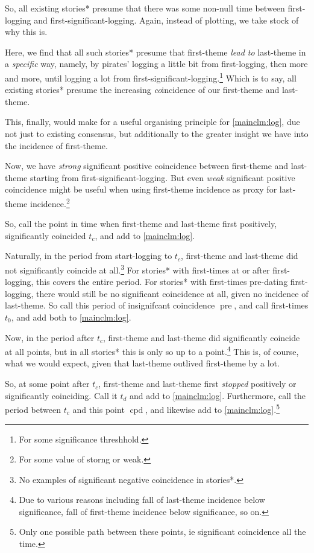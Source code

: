 \documentclass{amsart}
\DeclareMathOperator{\pre}{pre}%
\DeclareMathOperator{\cpd}{cpd}%
\theoremstyle{definition}
\theoremstyle{remark}
\begin{document}
			So, all existing stories* presume that there was some non-null time between first-logging and first-significant-logging. Again, instead of plotting, we take stock of why this is.
			
			Here, we find that all such stories* presume that first-theme \emph{lead to} last-theme in a \emph{specific} way, namely, by pirates' logging a little bit from first-logging, then more and more, until logging a lot from first-significant-logging.\footnote{For some significance threshhold.} Which is to say, all existing stories* presume the increasing \emph{co}incidence of our first-theme and last-theme.
			
			This, finally, would make for a useful organising principle for \ref{mainclm:log}, due not just to existing consensus, but additionally to the greater insight we have into the incidence of first-theme.
			
			Now, we have \emph{strong} significant positive coincidence between first-theme and last-theme starting from first-significant-logging. But even \emph{weak} significant positive coincidence might be useful when using first-theme incidence as proxy for last-theme incidence.\footnote{For some value of storng or weak.}
			
			So, call the point in time when first-theme and last-theme first positively, significantly coincided \(t_{c}\), and add to \ref{mainclm:log}.
			
			Naturally, in the period from start-logging to \(t_{c}\), first-theme and last-theme did not significantly coincide at all.\footnote{No examples of significant negative coincidence in stories*.} For stories* with first-times at or after first-logging, this covers the entire period. For stories* with first-times pre-dating first-logging, there would still be no significant coincidence at all, given no incidence of last-theme. So call this period of insignifcant coincidence \(\pre\), and call first-times \(t_{0}\), and add both to \ref{mainclm:log}.
			
			Now, in the period after \(t_{c}\), first-theme and last-theme did significantly coincide at all points, but in all stories* this is only so up to a point.\footnote{Due to various reasons including fall of last-theme incidence below significance, fall of first-theme incidence below significance, so on.} This is, of course, what we would expect, given that last-theme outlived first-theme by a lot.
			
			So, at some point after \(t_{c}\), first-theme and last-theme first \emph{stopped} positively or significantly coinciding. Call it \(t_{d}\) and add to \ref{mainclm:log}. Furthermore, call the period between \(t_{c}\) and this point \(\cpd\), and likewise add to \ref{mainclm:log}.\footnote{Only one possible path between these points, ie significant coincidence all the time.}
			
\end{document}
